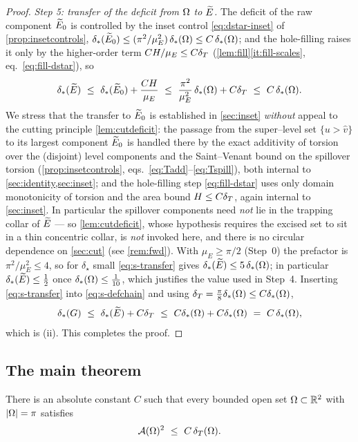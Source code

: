 \begin{proof}
\emph{Step 5: transfer of the deficit from $\Omega$ to $\widetilde{E}$.} The deficit of
the raw component $\widetilde{E}_0$ is controlled by the inset control
\eqref{eq:dstar-inset} of \cref{prop:insetcontrols},
$\delta_{*}(\widetilde{E}_0)\le(\pi^2/\mu_E^2)\,\delta_{*}(\Omega)\le C\,\delta_{*}(\Omega)$; and the
hole-filling raises it only by the higher-order term $CH/\mu_E\le C\delta_T$
(\cref{lem:fill}\ref{it:fill-scales}, eq.~\eqref{eq:fill-dstar}), so
\begin{equation}\label{eq:s-transfer}
   \dstar(\Etil)\ \le\ \dstar(\Etil_0)+\frac{CH}{\mu_E}
   \ \le\ \frac{\pi^2}{\mu_E^2}\,\dstar(\Om)+C\dT\ \le\ C\,\dstar(\Om).
\end{equation}
We stress that the transfer to $\widetilde{E}_0$ is established in \cref{sec:inset}
\emph{without} appeal to the cutting principle \cref{lem:cutdeficit}: the
passage from the super--level set $\{u>\hat v\}$ to its largest component
$\widetilde{E}_0$ is handled there by the exact additivity of torsion over the
(disjoint) level components and the Saint--Venant bound on the spillover
torsion (\cref{prop:insetcontrols}, eqs.~\eqref{eq:Tadd}--\eqref{eq:Tspill}),
both internal to \cref{sec:identity,sec:inset}; and the hole-filling step
\eqref{eq:fill-dstar} uses only domain monotonicity of torsion and the area
bound $H\le C\delta_T$, again internal to \cref{sec:inset}. In particular the
spillover components need \emph{not} lie in the trapping collar of $\widetilde{E}$ ---
so \cref{lem:cutdeficit}, whose hypothesis requires the excised set to sit in
a thin concentric collar, is \emph{not} invoked here, and there is no circular
dependence on \cref{sec:cut} (see \cref{rem:fwd}). With $\mu_E\ge\pi/2$
(Step~0) the prefactor is $\pi^2/\mu_E^2\le4$, so for $\delta_\star$ small
\eqref{eq:s-transfer} gives $\delta_{*}(\widetilde{E})\le 5\,\delta_{*}(\Omega)$; in particular
$\delta_{*}(\widetilde{E})\le\tfrac12$ once $\delta_{*}(\Omega)\le\tfrac1{10}$, which justifies
the value used in Step~4. Inserting \eqref{eq:s-transfer} into
\eqref{eq:s-defchain} and using $\delta_T=\tfrac\pi8\delta_{*}(\Omega)\le C\delta_{*}(\Omega)$,
\[
   \dstar(G)\ \le\ \dstar(\Etil)+C\dT\ \le\ C\dstar(\Om)+C\dstar(\Om)
   \ =\ C\,\dstar(\Om),
\]
which is (ii). This completes the proof.
\end{proof}

\subsection{The main theorem}

\begin{theorem}
\label{thm:main}
There is an absolute constant $C$ such that every bounded open set
$\Omega\subset\mathbb{R}^2$ with $\left\lvert\Omega\right\rvert=\pi$ satisfies
\begin{equation}\label{eq:main}
   \mathcal{A}(\Omega)^2\ \le\ C\,\delta_T(\Omega).
\end{equation}
\end{theorem}

